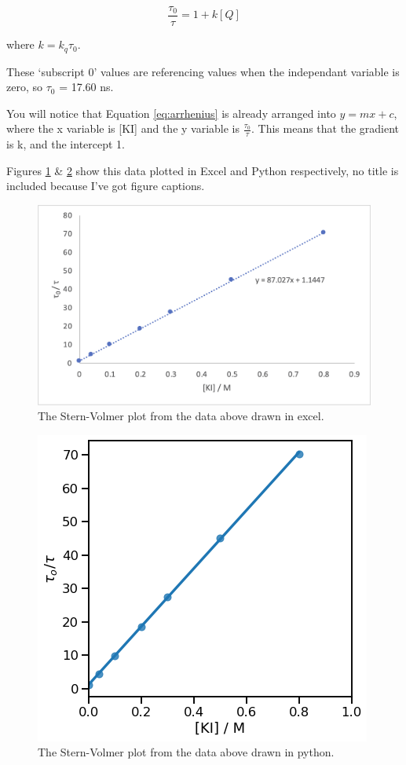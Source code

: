 \documentclass[
]{book}
\begin{document}
\begin{equation}
\frac{\tau_0}{\tau}=1+k[Q]
\label{eq:sternvolmer}
\end{equation}

where \(k = k_q \tau_0\).

These `subscript 0' values are referencing values when the independant variable is zero, so \(\tau_0\) = 17.60 ns.

You will notice that Equation \eqref{eq:arrhenius} is already arranged into \(y=mx+c\), where the x variable is {[}KI{]} and the y variable is \(\frac{\tau_0}{\tau}\). This means that the gradient is k, and the intercept 1.

Figures \ref{fig:excel} \& \ref{fig:python} show this data plotted in Excel and Python respectively, no title is included because I've got figure captions.

\begin{figure}

{\centering \includegraphics[width=0.7\linewidth]{images/graphexcel} 

}

\caption{The Stern-Volmer plot from the data above drawn in excel.}\label{fig:excel}
\end{figure}

\begin{figure}

{\centering \includegraphics[width=0.5\linewidth]{images/graphpython} 

}

\caption{The Stern-Volmer plot from the data above drawn in python.}\label{fig:python}
\end{figure}
\end{document}
